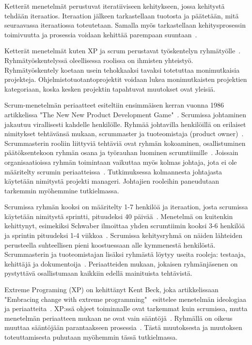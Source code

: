 \documentclass[finnish]{tktltiki2}
\theoremstyle{definition}
\theoremstyle{remark}
\begin{document}
Ketterät menetelmät perustuvat iteratiiviseen kehitykseen, jossa kehitystä tehdään iteraatios\cite{cohen2004introduction}. Iteraation jälkeen tarkastellaan tuotosta ja päätetään, mitä seuraavassa iteraatiossa toteutetaan. Samalla myös tarkastellaan kehitysprosessin toimivuutta ja prosessia voidaan kehittää parempaan suuntaan~\cite{cohen2004introduction}.


Ketterät menetelmät kuten XP ja scrum perustavat työskentelyn ryh\-mä\-työl\-le~\cite{4755768}. Ryhmätyöskentelyssä oleellisessa roolissa on ihmisten yhteistyö. Ryhmätyöskentely koetaan usein tehokkaaksi tavaksi totetuttaa monimutkaisia projekteja. Ohjelmistotuotantoprojektit voidaan lukea monimutkaisten projektien kategoriaan, koska kesken projektin tapahtuvat muutokset ovat yleisiä.

Scrum-menetelmän periaatteet esiteltiin ensimmäisen kerran vuonna 1986 artikkelissa "The New New Product Development Game"~\cite{nonaka1986new}. Scrumissa johtaminen jakautuu virallisesti kahdelle henkilölle. Ryhmää johtavilla henkilöillä on erilaiset nimitykset tehtävänsä mukaan, scrummaster ja tuoteomistaja (product owner)~\cite{4755768}. Scrummasterin rooliin liittyviä tehtäviä ovat ryhmän kokoaminen, osallistuminen päätöksentekoon ryhmän osana ja työrauhan luominen scrumtiimille~\cite{4755768}. Joissain organisaatioissa ryhmän toimintaan vaikuttaa myös kolmas johtaja, jota ei ole määritelty scrumin periaatteissa~\cite{4755768}. Tutkimuksessa kolmannesta johtajasta käytetään nimitystä projekti manageri. Johtajien rooleihin paneudutaan tarkemmin myöhemmine tutkielmassa. 

Scrumissa ryhmän kooksi on määritelty 1-7 henkilöä ja iteraation, josta scrumissa käytetään nimitystä sprintti, pituudeksi 40 päivää~\cite{cohen2004introduction}. Menetelmä on kuitenkin kehittynyt, esimekiksi Schwaber ilmoittaa yhden scrumtiimin kooksi 3-6 henkilöä ja sprintin pituudeksi 1-4 viikkoa~\cite{schwaber1995scrum}. Scrumissa kehitysryhmä on näiden lähteiden perusteella suhteellisen pieni koostuessaan alle kymmenestä henkilöstä. Scrummasterin ja tuoteomistajan lisäksi ryhmästä löytyy useita rooleja: testaaja, kehittäjä ja dokumentoija~\cite{schwaber1995scrum}. Periaatteiden mukaan, jokaisen ryhmänjäsenen on pystyttävä osallistumaan kaikkiin edellä mainituista tehtävistä.

Extreme Programing (XP) on kehittänyt Kent Beck, joka artikkelissaan "Embracing change with extreme programming"  \ esittelee menetelmän ideologiaa ja periaatteita~\cite{796139}. XP:ssä ohjeet toiminnalle ovat tarkemmat kuin scrumissa, mutta menetelmän periaatteen mukaan ne ovat vain sääntöjä~\cite{cohen2004introduction}. Ryhmällä on oikeus muuttaa sääntöjään parantaakseen prosessia~\cite{cohen2004introduction}. Tästä muutoksesta ja muutoksen toteuttamisesta puhutaan myöhemmin tässä tutkielmassa.
\end{document}
